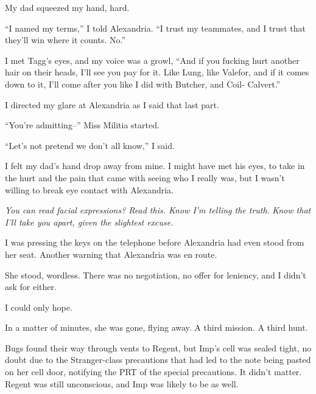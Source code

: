 My dad squeezed my hand, hard.



``I named my terms,'' I told Alexandria.  ``I trust my teammates, and I trust that they'll win where it counts.  No.''



I met Tagg's eyes, and my voice was a growl, ``And if you fucking hurt another hair on their heads, I'll see you pay for it.  Like Lung, like Valefor, and if it comes down to it, I'll come after you like I did with Butcher, and Coil- Calvert.''



I directed my glare at Alexandria as I said that last part.



``You're admitting--'' Miss Militia started.



``Let's not pretend we don't all know,'' I said.



I felt my dad's hand drop away from mine.  I might have met his eyes, to take in the hurt and the pain that came with seeing who I really was, but I wasn't willing to break eye contact with Alexandria.



\emph{You can read facial expressions?  Read this.  Know I'm telling the truth}.  \emph{Know that I'll take you apart, given the slightest excuse.}



I was pressing the keys on the telephone before Alexandria had even stood from her seat.  Another warning that Alexandria was en route.



She stood, wordless.  There was no negotiation, no offer for leniency, and I didn't ask for either.



I could only hope.



In a matter of minutes, she was gone, flying away.  A third mission.  A third hunt.



Bugs found their way through vents to Regent, but Imp's cell was sealed tight, no doubt due to the Stranger-class precautions that had led to the note being pasted on her cell door, notifying the PRT of the special precautions.  It didn't matter.  Regent was still unconscious, and Imp was likely to be as well.



